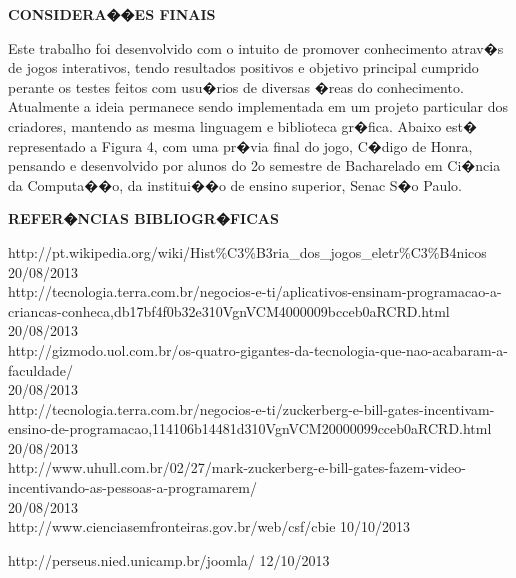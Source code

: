 \documentclass[a4paper]{article}
\begin{document}
\break

\begin{flushleft}
\textbf{\large CONSIDERA��ES FINAIS}
\end{flushleft}

Este trabalho foi desenvolvido com o intuito de promover conhecimento atrav�s de
jogos interativos, tendo resultados positivos e objetivo principal cumprido perante os
testes feitos com usu�rios de diversas �reas do conhecimento.
Atualmente a ideia permanece sendo implementada em um projeto particular
dos criadores, mantendo as mesma linguagem e biblioteca gr�fica. Abaixo est�
representado a Figura 4, com uma pr�via final do jogo, C�digo de Honra, pensando e
desenvolvido por alunos do 2o semestre de Bacharelado em Ci�ncia da Computa��o, da
institui��o de ensino superior, Senac S�o Paulo.

\break

\begin{flushleft}
\textbf{\large REFER�NCIAS BIBLIOGR�FICAS\\}
\end{flushleft}

http://pt.wikipedia.org/wiki/Hist\%C3\%B3ria\_dos\_jogos\_eletr\%C3\%B4nicos\\
20/08/2013\\

http://tecnologia.terra.com.br/negocios-e-ti/aplicativos-ensinam-programacao-a-criancas-conheca,db17bf4f0b32e310VgnVCM4000009bcceb0aRCRD.html\\
20/08/2013\\

http://gizmodo.uol.com.br/os-quatro-gigantes-da-tecnologia-que-nao-acabaram-a-faculdade/\\
20/08/2013\\

http://tecnologia.terra.com.br/negocios-e-ti/zuckerberg-e-bill-gates-incentivam-ensino-de-programacao,114106b14481d310VgnVCM20000099cceb0aRCRD.html\\
20/08/2013\\

http://www.uhull.com.br/02/27/mark-zuckerberg-e-bill-gates-fazem-video-incentivando-as-pessoas-a-programarem/\\
20/08/2013\\

http://www.cienciasemfronteiras.gov.br/web/csf/cbie
10/10/2013

http://perseus.nied.unicamp.br/joomla/
12/10/2013

\break
\end{document}
